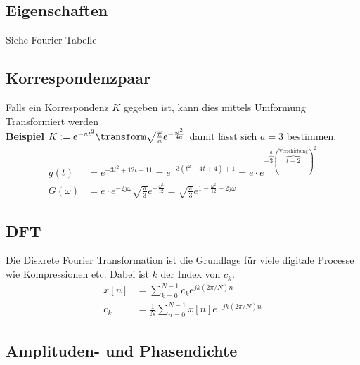 \subsection{Eigenschaften}
Siehe Fourier-Tabelle

\subsection{Korrespondenzpaar}
Falls ein Korrespondenz $K$ gegeben ist, kann dies mittels Umformung Transformiert werden\\
\noindent\textbf{Beispiel} $K := e^{-at^2} \transform \sqrt{\frac{\pi}{a}}e^{-\frac{\omega^2}{4a}}$ damit lässt sich $a = 3$ bestimmen. 
\begin{align*}
	g(t) &= e^{-3t^2 + 12t - 11} = e^{-3(t^2 -4t + 4) + 1} = e\cdot e^{-\overbrace{3}^{a}(\overbrace{t-2}^{\text{Verschiebung}})^2}\\
	G(\omega) &= e\cdot e^{-2j\omega}\sqrt{\frac{\pi}{3}}e^{-\frac{\omega^2}{12}} = \sqrt{\frac{\pi}{3}}e^{1-\frac{\omega^2}{12}-2j\omega}
\end{align*}

\subsection{DFT}
Die Diskrete Fourier Transformation ist die Grundlage für viele digitale Processe wie Kompressionen etc. Dabei ist $k$ der Index von $c_k$.
\begin{align*}
	x[n] &= \sum_{k=0}^{N-1}c_k e^{jk(2\pi/N)n}  \\
	c_k &= \frac{1}{N}\sum_{n=0}^{N-1}x[n]e^{-jk(2\pi/N)n}
\end{align*}


\subsection{Amplituden- und Phasendichte}
